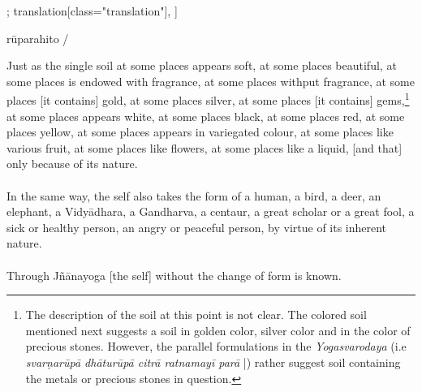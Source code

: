 \begin{alignment}[
  texts=edition[class="edition"];
  translation[class="translation"],
  ]
\begin{edition}
\begin{prose}[p22_02]
rūparahito
/
\end{prose}
  \end{edition}
  \begin{translation}
    \begin{tlate}[p22_02]
      \noindent
Just as the single soil at some places appears soft, at some places beautiful, at some places is endowed with fragrance, at some places withput fragrance, at some places [it contains] gold, at some places silver, at some places [it contains] gems,\footnote{The description of the soil at this point is not clear. The colored soil mentioned next suggests a soil in golden color, silver color and in the color of precious stones. However, the parallel formulations in the \textit{Yogasvarodaya} (i.e \textit{svarṇarūpā dhāturūpā citrā ratnamayī parā} |) rather suggest soil containing the metals or precious stones in question.} at some places appears white, at some places black, at some places red, at some places yellow, at some places appears in variegated colour, at some places like various fruit, 
at some places like flowers, at some places like a liquid, [and that] only because of its nature. \\\\
In the same way, the self also takes the form of a human, a bird, a deer, an elephant, a Vidyādhara, a Gandharva, a centaur, a great scholar or a great fool, 
a sick or healthy person, an angry or peaceful person, by virtue of its inherent nature. \\\\
Through Jñānayoga [the self] without the change of form is known.  
\flushpage
\end{tlate}
  \end{translation}
\end{alignment}
\pagebreak %
